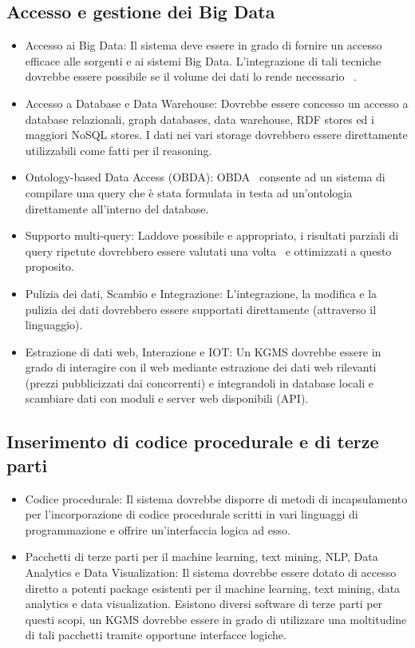 \subsection{Accesso e gestione dei Big Data}

\begin{itemize}
	\item Accesso ai Big Data: Il sistema deve essere in grado di fornire un accesso efficace alle sorgenti e ai sistemi Big Data. L'integrazione di tali tecniche dovrebbe essere possibile se il volume dei dati lo rende necessario ~\cite{shkapsky2016big}.
	\item Accesso a Database e Data Warehouse: Dovrebbe essere concesso un accesso a database relazionali, graph databases, data warehouse, RDF stores ed i maggiori NoSQL stores. I dati nei vari storage dovrebbero essere direttamente utilizzabili come fatti per il reasoning.
	\item Ontology-based Data Access (OBDA): OBDA~\cite{calvanese2011mastro} consente ad un sistema di compilare una query che è stata formulata in testa ad un'ontologia direttamente all'interno del database.
	\item Supporto multi-query: Laddove possibile e appropriato, i risultati parziali di query ripetute dovrebbero essere valutati una volta~\cite{roy2000efficient} e ottimizzati a questo proposito.
	\item Pulizia dei dati, Scambio e Integrazione: L'integrazione, la modifica e la pulizia dei dati dovrebbero essere supportati direttamente (attraverso il linguaggio).
	\item Estrazione di dati web, Interazione e IOT: Un KGMS dovrebbe essere in grado di interagire con il web mediante estrazione dei dati web rilevanti (prezzi pubblicizzati dai concorrenti) e integrandoli in database locali e scambiare dati con moduli e server web disponibili (API).
\end{itemize}

\subsection{Inserimento di codice procedurale e di terze parti}

\begin{itemize}
	\item Codice procedurale: Il sistema dovrebbe disporre di metodi di incapsulamento per l'incorporazione di codice procedurale scritti in vari linguaggi di programmazione e offrire un'interfaccia logica ad esso.
	\item Pacchetti di terze parti per il machine learning, text mining, NLP, Data Analytics e Data Visualization: Il sistema dovrebbe essere dotato di accesso diretto a potenti package esistenti per il machine learning, text mining, data analytics e data visualization. Esistono diversi software di terze parti per questi scopi, un KGMS dovrebbe essere in grado di utilizzare una moltitudine di tali pacchetti tramite opportune interfacce logiche.
\end{itemize}

